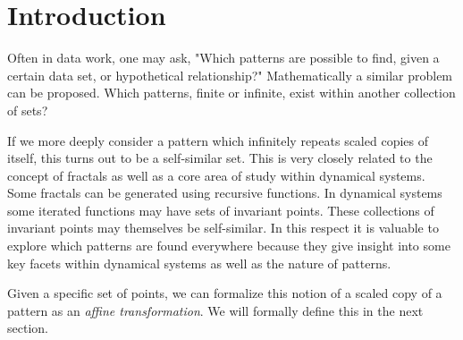 \chapter{Introduction}


Often in data work, one may ask, "Which patterns are possible to find, given a certain data set, or hypothetical relationship?"  Mathematically a similar problem can be proposed.  Which patterns, finite or infinite, exist within another collection of sets?  

If we more deeply consider a pattern which infinitely repeats scaled copies of itself, this turns out to be a self-similar set.  This is very closely related to the concept of fractals as well as a core area of study within dynamical systems.  Some fractals can be generated using recursive functions.  In dynamical systems some iterated functions may have sets of invariant points.  These collections of invariant points may themselves be self-similar.  In this respect it is valuable to explore which patterns are found everywhere because they give insight into some key facets within dynamical systems as well as the nature of patterns.  

Given a specific set of points, we can formalize this notion of a scaled copy of a pattern as an \textit{affine transformation}.  We will formally define this in the next section.

